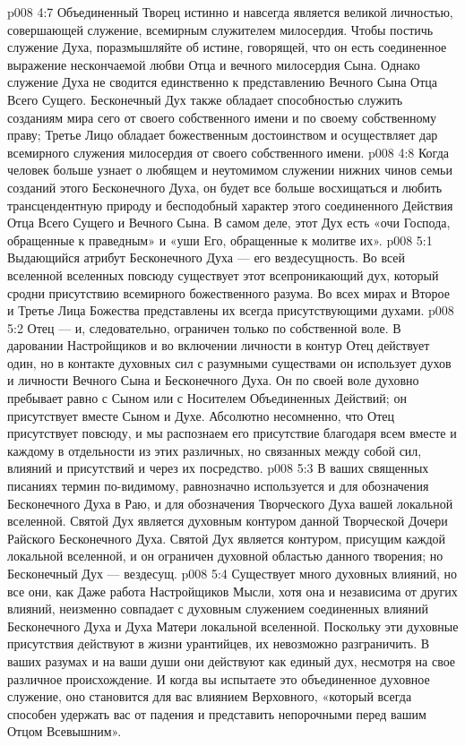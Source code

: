 \vs p008 4:7 \pc Объединенный Творец истинно и навсегда является великой личностью, совершающей служение, всемирным служителем милосердия. Чтобы постичь служение Духа, поразмышляйте об истине, говорящей, что он есть соединенное выражение нескончаемой любви Отца и вечного милосердия Сына. Однако служение Духа не сводится единственно к представлению Вечного Сына Отца Всего Сущего. Бесконечный Дух также обладает способностью служить созданиям мира сего от своего собственного имени и по своему собственному праву; Третье Лицо обладает божественным достоинством и осуществляет дар всемирного служения милосердия от своего собственного имени.
\vs p008 4:8 Когда человек больше узнает о любящем и неутомимом служении нижних чинов семьи созданий этого Бесконечного Духа, он будет все больше восхищаться и любить трансцендентную природу и бесподобный характер этого соединенного Действия Отца Всего Сущего и Вечного Сына. В самом деле, этот Дух есть «очи Господа, обращенные к праведным» и «уши Его, обращенные к молитве их».
\vs p008 5:1 Выдающийся атрибут Бесконечного Духа --- его вездесущность. Во всей вселенной вселенных повсюду существует этот всепроникающий дух, который сродни присутствию всемирного божественного разума. Во всех мирах и Второе и Третье Лица Божества представлены их всегда присутствующими духами.
\vs p008 5:2 Отец ---  и, следовательно, ограничен только по собственной воле. В даровании Настройщиков и во включении личности в контур Отец действует один, но в контакте духовных сил с разумными существами он использует духов и личности Вечного Сына и Бесконечного Духа. Он по своей воле духовно пребывает равно с Сыном или с Носителем Объединенных Действий; он присутствует вместе  Сыном и  Духе. Абсолютно несомненно, что Отец присутствует повсюду, и мы распознаем его присутствие благодаря всем вместе и каждому в отдельности из этих различных, но связанных между собой сил, влияний и присутствий и через их посредство.
\vs p008 5:3 \pc В ваших священных писаниях термин  по\hyp{}видимому, равнозначно используется и для обозначения Бесконечного Духа в Раю, и для обозначения Творческого Духа вашей локальной вселенной. Святой Дух является духовным контуром данной Творческой Дочери Райского Бесконечного Духа. Святой Дух является контуром, присущим каждой локальной вселенной, и он ограничен духовной областью данного творения; но Бесконечный Дух --- вездесущ.
\vs p008 5:4 \pc Существует много духовных влияний, но все они, как  Даже работа Настройщиков Мысли, хотя она и независима от других влияний, неизменно совпадает с духовным служением соединенных влияний Бесконечного Духа и Духа Матери локальной вселенной. Поскольку эти духовные присутствия действуют в жизни урантийцев, их невозможно разграничить. В ваших разумах и на ваши души они действуют как единый дух, несмотря на свое различное происхождение. И когда вы испытаете это объединенное духовное служение, оно становится для вас влиянием Верховного, «который всегда способен удержать вас от падения и представить непорочными перед вашим Отцом Всевышним».
